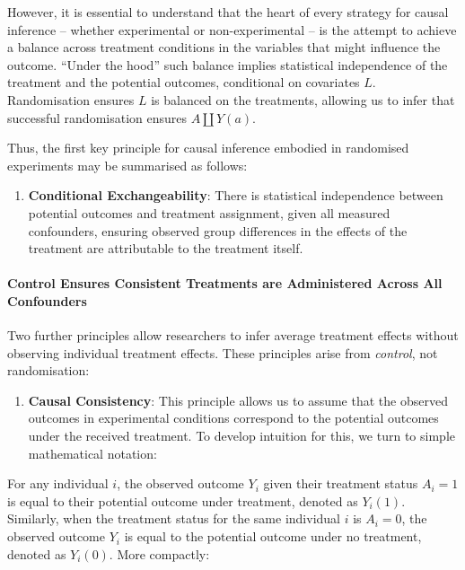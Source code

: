 \documentclass[
  singlecolumn]{article}
\let\oldparagraph\paragraph
\renewcommand{\paragraph}[1]{\oldparagraph{#1}\mbox{}}
\providecommand{\tightlist}{%
  \setlength{\itemsep}{0pt}\setlength{\parskip}{0pt}}\usepackage{longtable,booktabs,array}
\begin{document}
However, it is essential to understand that the heart of every strategy
for causal inference -- whether experimental or non-experimental -- is
the attempt to achieve a balance across treatment conditions in the
variables that might influence the outcome. ``Under the hood'' such
balance implies statistical independence of the treatment and the
potential outcomes, conditional on covariates \(L\). Randomisation
ensures \(L\) is balanced on the treatments, allowing us to infer that
successful randomisation ensures \(A \coprod Y(a)\).

Thus, the first key principle for causal inference embodied in
randomised experiments may be summarised as follows:

\begin{enumerate}
\def\labelenumi{\arabic{enumi}.}
\tightlist
\item
  \textbf{Conditional Exchangeability}: There is statistical
  independence between potential outcomes and treatment assignment,
  given all measured confounders, ensuring observed group differences in
  the effects of the treatment are attributable to the treatment itself.
\end{enumerate}

\paragraph{Control Ensures Consistent Treatments are Administered Across
All
Confounders}\label{control-ensures-consistent-treatments-are-administered-across-all-confounders}

Two further principles allow researchers to infer average treatment
effects without observing individual treatment effects. These principles
arise from \emph{control}, not randomisation:

\begin{enumerate}
\def\labelenumi{\arabic{enumi}.}
\setcounter{enumi}{1}
\tightlist
\item
  \textbf{Causal Consistency}: This principle allows us to assume that
  the observed outcomes in experimental conditions correspond to the
  potential outcomes under the received treatment. To develop intuition
  for this, we turn to simple mathematical notation:
\end{enumerate}

For any individual \(i\), the observed outcome \(Y_i\) given their
treatment status \(A_i = 1\) is equal to their potential outcome under
treatment, denoted as \(Y_i(1)\). Similarly, when the treatment status
for the same individual \(i\) is \(A_i = 0\), the observed outcome
\(Y_i\) is equal to the potential outcome under no treatment, denoted as
\(Y_i(0)\). More compactly:
\end{document}
